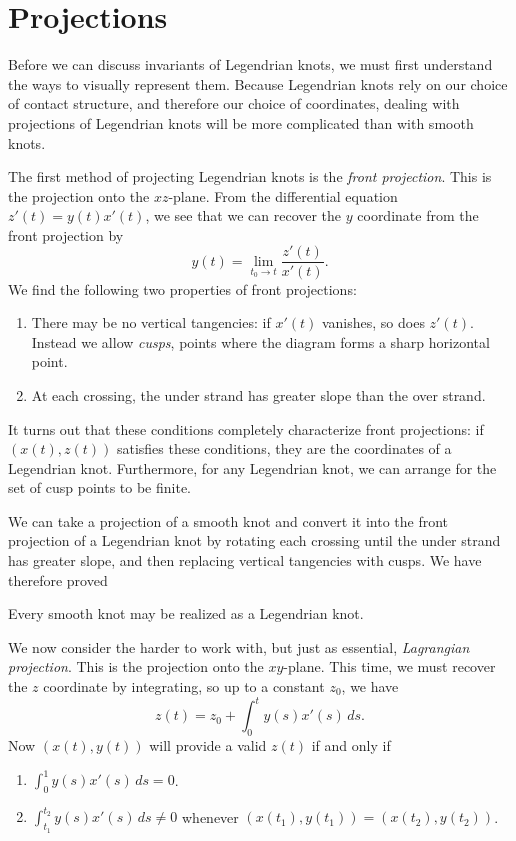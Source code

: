 \documentclass{article}
\begin{document}
\section{Projections}
Before we can discuss invariants of Legendrian knots, we must first understand
the ways to visually represent them.
Because Legendrian knots rely on our choice of contact structure, and therefore
our choice of coordinates, dealing with projections of Legendrian knots will
be more complicated than with smooth knots.

The first method of projecting Legendrian knots is the {\it front projection}.
This is the projection onto the $xz$-plane. From the differential equation
$z'(t) = y(t)x'(t)$, we see that we can recover the $y$ coordinate from the front
projection by
\[y(t) = \lim_{t_0\to t}\frac{z'(t)}{x'(t)}.\]
We find the following two properties of front projections:
\begin{enumerate}[label=\roman*)]
\item There may be no vertical tangencies: if $x'(t)$ vanishes, so does $z'(t)$. Instead we 
allow {\it cusps}, points where the diagram forms a sharp horizontal point.
\item At each crossing, the under strand has greater slope than the over strand.
\end{enumerate}
It turns out that these conditions completely characterize front projections:
if $(x(t),z(t))$ satisfies these conditions, they are the coordinates of a Legendrian knot.
Furthermore, for any Legendrian knot, we can arrange for the set of cusp points to be finite.

We can take a projection of a smooth knot and convert it into the front
projection of a Legendrian knot by rotating each crossing until the under
strand has greater slope, and then
replacing vertical tangencies with cusps. We have therefore proved
\begin{theorem}
Every smooth knot may be realized as a Legendrian knot.
\end{theorem}

We now consider the harder to work with, but just as essential, {\it Lagrangian projection}.
This is the projection onto the $xy$-plane. This time, we must recover the $z$ coordinate
by integrating, so up to a constant $z_0$, we have
\[ z(t) = z_0 + \int_0^t y(s)x'(s)\,ds.\]
Now $(x(t),y(t))$ will provide a valid $z(t)$ if and only if
\begin{enumerate}[label=\roman*)]
\item $\int_0^1 y(s)x'(s)\,ds = 0$.
\item $\int_{t_1}^{t_2} y(s)x'(s)\,ds \neq 0$ whenever $(x(t_1),y(t_1))=(x(t_2),y(t_2))$.
\end{enumerate}
\end{document}
